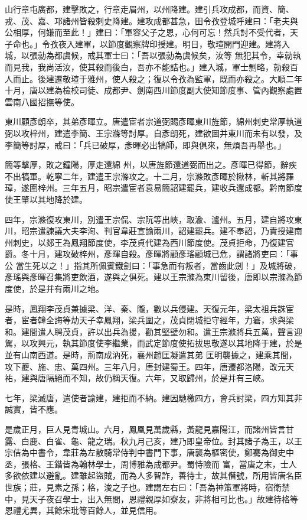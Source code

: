 \begin{pinyinscope}
 山行章屯廣都，建擊敗之，行章走眉州，以州降建。建引兵攻成都，而資、簡、戎、茂、嘉、邛諸州皆殺刺史降建。建攻成都甚急，田令孜登城呼建曰：「老夫與公相厚，何嫌而至此！」建曰：「軍容父子之恩，心何可忘！然兵討不受代者，天子命也。」令孜夜入建軍，以節度觀察牌印授建。明日，敬瑄開門迎建。建將入城，以張勍為都虞候，戒其軍士曰：「吾以張勍為虞候矣，汝等
 無犯其令，幸勍執而見我，我尚活汝，使其殺而後白，吾亦不能詰也。」建入城，軍士剽略，勍殺百人而止。後建遷敬瑄于雅州，使人殺之；復以令孜為監軍，既而亦殺之。大順二年十月，唐以建為檢校司徒、成都尹、劍南西川節度副大使知節度事、管內觀察處置雲南八國招撫等使。



 東川顧彥朗卒，其弟彥暉立。唐遣宦者宗道弼賜彥暉東川旌節，綿州刺史常厚執道弼以攻梓州，建遣李簡、王宗滌等討厚。自彥朗死，建欲圖并東川而未有以發，及李簡等討厚，戒曰：「兵已破厚，彥暉必出犒師，即與俱來，無煩吾再舉也。」



 簡等擊厚，敗之鐘陽，厚走還綿
 州，以唐旌節還道弼而出之。彥暉已得節，辭疾不出犒軍。乾寧二年，建遣王宗滌攻之。十二月，宗滌敗彥暉於楸林，斬其將羅璋，遂圍梓州。三年五月，昭宗遣宦者袁易簡詔建罷兵，建收兵還成都。黔南節度使王肇以其地降於建。



 四年，宗滌復攻東川，別遣王宗侃、宗阮等出峽，取渝、瀘州。五月，建自將攻東川，昭宗遣諫議大夫李洵、判官韋莊宣諭兩川，詔建罷兵。建不奉詔，乃責授建南州刺史，以郯王為鳳翔節度使，李茂貞代建為西川節度使。茂貞拒命，乃復建官爵。冬十月，建攻破梓州，彥暉自殺。彥暉將顧彥瑤顧城已危，謂諸將吏曰：「事公
 當生死以之！」指其所佩賓鐵劍曰：「事急而有叛者，當齒此劍！」及城將破，彥瑤與彥暉召集將吏飲酒，遂與之俱死。建以王宗滌為東川留後，唐即以宗滌為節度使，於是并有兩川之地。



 是時，鳳翔李茂貞兼據梁、洋、秦、隴，數以兵侵建。天復元年，梁太祖兵誅宦者，宦者韓全誨等劫天子幸鳳翔，梁兵圍之，茂貞閉城拒守經年，力窘，求與梁和。建間遣人聘茂貞，許以出兵為援，勸其堅壁勿和。遣王宗滌將兵五萬，聲言迎駕，以攻興元，執其節度使李繼業，而武定節度使拓拔思敬遂以其地降于建，於是並有山南西道。是時，荊南成汭死，襄州趙匡凝遣其弟
 匡明襲據之，建乘其間，攻下夔、施、忠、萬四州。三年八月，唐封建蜀王。四年，唐遷都洛陽，改元天祐，建與唐隔絕而不知，故仍稱天復。六年，又取歸州，於是并有三峽。



 七年，梁滅唐，遣使者諭建，建拒而不納。建因馳檄四方，會兵討梁，四方知其非誠實，皆不應。



 是歲正月，巨人見青城山。六月，鳳凰見萬歲縣，黃龍見嘉陽江，而諸州皆言甘露、白鹿、白雀、龜、龍之瑞。秋九月己亥，建乃即皇帝位。封其諸子為王，以王宗佶為中書令，韋莊為左散騎常侍判中書門下事，唐襲為樞密使，鄭騫為御史中丞，張格、王鍇皆為翰林學士，周博雅為成都尹。蜀恃險而
 富，當唐之末，士人多欲依建以避亂。建雖起盜賊，而為人多智詐，善待士，故其僭號，所用皆唐名臣世族；莊，見素之孫；格，浚之子也。建謂左右曰：「吾為神策軍將時，宿衛禁中，見天子夜召學士，出入無間，恩禮親厚如寮友，非將相可比也。」故建待格等恩禮尤異，其餘宋玭等百餘人，並見信用。




\end{pinyinscope}
